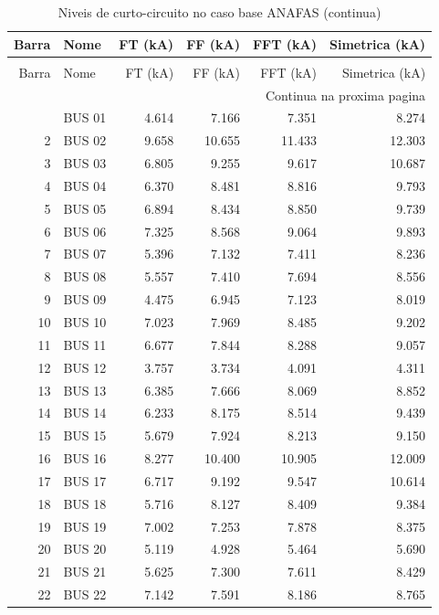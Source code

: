 \documentclass[12pt]{classe_uftex/uftex}
\begin{document}
\scriptsize
\begin{longtable}{rlrrrr}
\caption{Niveis de curto-circuito no caso base ANAFAS}\label{tab:anafas-curtos-base}\\
\toprule
Barra & Nome & FT (kA) & FF (kA) & FFT (kA) & Simetrica (kA) \\
\midrule
\endfirsthead
\caption[]{Niveis de curto-circuito no caso base ANAFAS (continua)}\\
\toprule
Barra & Nome & FT (kA) & FF (kA) & FFT (kA) & Simetrica (kA) \\
\midrule
\endhead
\midrule
\multicolumn{6}{r}{Continua na proxima pagina}\\
\endfoot
\bottomrule
\endlastfoot
1 & BUS 01 & 4.614 & 7.166 & 7.351 & 8.274 \\
2 & BUS 02 & 9.658 & 10.655 & 11.433 & 12.303 \\
3 & BUS 03 & 6.805 & 9.255 & 9.617 & 10.687 \\
4 & BUS 04 & 6.370 & 8.481 & 8.816 & 9.793 \\
5 & BUS 05 & 6.894 & 8.434 & 8.850 & 9.739 \\
6 & BUS 06 & 7.325 & 8.568 & 9.064 & 9.893 \\
7 & BUS 07 & 5.396 & 7.132 & 7.411 & 8.236 \\
8 & BUS 08 & 5.557 & 7.410 & 7.694 & 8.556 \\
9 & BUS 09 & 4.475 & 6.945 & 7.123 & 8.019 \\
10 & BUS 10 & 7.023 & 7.969 & 8.485 & 9.202 \\
11 & BUS 11 & 6.677 & 7.844 & 8.288 & 9.057 \\
12 & BUS 12 & 3.757 & 3.734 & 4.091 & 4.311 \\
13 & BUS 13 & 6.385 & 7.666 & 8.069 & 8.852 \\
14 & BUS 14 & 6.233 & 8.175 & 8.514 & 9.439 \\
15 & BUS 15 & 5.679 & 7.924 & 8.213 & 9.150 \\
16 & BUS 16 & 8.277 & 10.400 & 10.905 & 12.009 \\
17 & BUS 17 & 6.717 & 9.192 & 9.547 & 10.614 \\
18 & BUS 18 & 5.716 & 8.127 & 8.409 & 9.384 \\
19 & BUS 19 & 7.002 & 7.253 & 7.878 & 8.375 \\
20 & BUS 20 & 5.119 & 4.928 & 5.464 & 5.690 \\
21 & BUS 21 & 5.625 & 7.300 & 7.611 & 8.429 \\
22 & BUS 22 & 7.142 & 7.591 & 8.186 & 8.765 \\

\end{longtable}
\end{document}
